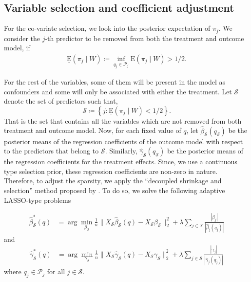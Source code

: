 \documentclass{amsart}
\newcommand{\lexp}{\underline{\text{E}}}
\begin{document}
\subsection{Variable selection and coefficient adjustment}
For the co-variate selection, we look into the posterior expectation of $\pi_j$. 
We consider the $j$-th predictor to be removed from both the
treatment and outcome model, if
\begin{align}
    \lexp (\pi_j\mid W)\coloneqq \inf_{q_j\in \mathcal{P}_j} \text{E}(\pi_j\mid W) > 1/2.
\end{align}

For the rest of the variables, some of them will be present
in the model as confounders and some will only be associated with
either the treatment. Let $\mathcal{S}$ denote the set of
predictors such that,
\begin{equation}
    \mathcal{S}\coloneqq
    \left\{j : \lexp(\pi_j\mid W) < 1/2\right\}.
\end{equation}
That is the set that contains all the variables which are not
removed from both treatment and outcome model. Now, for
each fixed value of $q$,
let $\hat{\beta}_{\mathcal{S}}(q_{\mathcal{S}})$ be the posterior means of the regression coefficients of the outcome model with respect to
the predictors that belong to $\mathcal{S}$. Similarly,
$\hat{\gamma}_{\mathcal{S}}(q_{\mathcal{S}})$ be the posterior means of the regression
coefficients for the treatment effects. Since, we use a continuous type
selection prior, these regression coefficients are non-zero in nature.
Therefore, to adjust the sparsity, we apply the 
``decoupled shrinkage and selection'' method proposed by \citet{hahn2015}. To do so, we solve the following adaptive LASSO-type \cite{Zou2006}
problems

\begin{align}
    \hat{\beta}^*_{\mathcal{S}}(q) &= 
    \arg\min_{\beta_{\mathcal{S}}} \frac{1}{n}\|X_{\mathcal{S}}\hat{\beta}_{\mathcal{S}}(q)
    - X_{\mathcal{S}} \beta_{\mathcal{S}}\|_2^2 + \lambda\sum_{j\in\mathcal{S}} 
    \frac{|\beta_j|}{|\hat{\beta}_j(q_j)|}
\end{align}
and
\begin{align}
    \hat{\gamma}^*_{\mathcal{S}}(q) &= 
    \arg\min_{\gamma_{\mathcal{S}}} \frac{1}{n}\|X_{\mathcal{S}}\hat{\gamma}_{\mathcal{S}}(q)
    - X_{\mathcal{S}} \gamma_{\mathcal{S}}\|_2^2 + \lambda\sum_{j\in\mathcal{S}} 
    \frac{|\gamma_j|}{|\hat{\gamma}_j(q_j)|}
\end{align}
where $q_{j}\in \mathcal{P}_{j}$ for all $j\in\mathcal{S}$.
\end{document}
